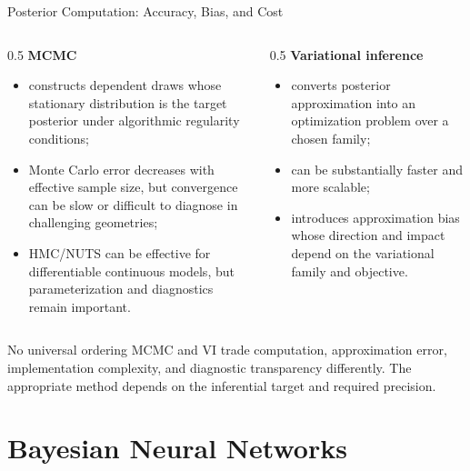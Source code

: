 \documentclass[aspectratio=169,11pt]{beamer}
\begin{document}
\begin{frame}{Posterior Computation: Accuracy, Bias, and Cost}
  \begin{columns}
    \begin{column}{0.5\textwidth}
      \textbf{MCMC}
      \begin{itemize}
        \item constructs dependent draws whose stationary distribution is the target posterior under algorithmic regularity conditions;
        \item Monte Carlo error decreases with effective sample size, but convergence can be slow or difficult to diagnose in challenging geometries;
        \item HMC/NUTS can be effective for differentiable continuous models, but parameterization and diagnostics remain important.
      \end{itemize}
    \end{column}
    \begin{column}{0.5\textwidth}
      \textbf{Variational inference}
      \begin{itemize}
        \item converts posterior approximation into an optimization problem over a chosen family;
        \item can be substantially faster and more scalable;
        \item introduces approximation bias whose direction and impact depend on the variational family and objective.
      \end{itemize}
    \end{column}
  \end{columns}

  \begin{alertblock}{No universal ordering}
    MCMC and VI trade computation, approximation error, implementation complexity, and diagnostic transparency differently. The appropriate method depends on the inferential target and required precision.
  \end{alertblock}
\end{frame}

\section{Bayesian Neural Networks}
\end{document}
